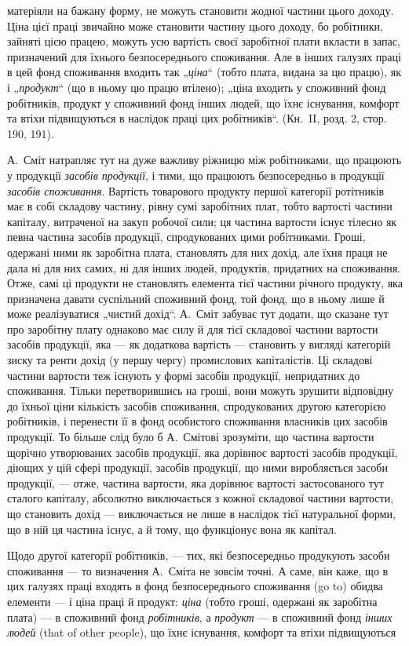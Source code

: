 \parcont{}  %
матеріяли на бажану форму, не можуть становити жодної частини цього
доходу. Ціна цієї праці звичайно може становити частину цього доходу,
бо робітники, зайняті цією працею, можуть усю вартість своєї заробітної
плати вкласти в запас, призначений для їхнього безпосереднього споживання.
Але в інших галузях праці в цей фонд споживання входить так
„\emph{ціна}“ (тобто плата, видана за цю працю), як і „\emph{продукт}“ (що в
ньому цю працю втілено); „ціна входить у споживний фонд робітників,
продукт у споживний фонд інших людей, що їхнє існування, комфорт
та втіхи підвищуються в наслідок праці цих робітників“. (Кн.~II, розд. 2,
стор. 190, 191).

А.~Сміт натрапляє тут на дуже важливу ріжницю між робітниками,
що працюють у продукції \emph{засобів продукції}, і тими, що працюють
безпосередньо в продукції \emph{засобів споживання}. Вартість
товарового продукту першої категорії ротітників має в собі складову
частину, рівну сумі заробітних плат, тобто вартості частини капіталу,
витраченої на закуп робочої сили; ця частина вартости існує тілесно як
певна частина засобів продукції, спродукованих цими робітниками. Гроші,
одержані ними як заробітна плата, становлять для них дохід, але їхня
праця не дала ні для них самих, ні для інших людей, продуктів, придатних
на споживання. Отже, самі ці продукти не становлять елемента
тієї частини річного продукту, яка призначена давати суспільний споживний
фонд, той фонд, що в ньому лише й може реалізуватися „чистий
дохід“. А.~Сміт забуває тут додати, що сказане тут про заробітну
плату однаково має силу й для тієї складової частини вартости засобів
продукції, яка — як додаткова вартість — становить у вигляді категорій
зиску та ренти дохід (у першу чергу) промислових капіталістів. Ці складові
частини вартости теж існують у формі засобів продукції, непридатних
до споживання. Тільки перетворившись на гроші, вони можуть
зрушити відповідну до їхньої ціни кількість засобів споживання, спродукованих
другою категорією робітників, і перенести її в фонд особистого
споживання власників цих засобів продукції. То більше слід було б
А.~Смітові зрозуміти, що частина вартости щорічно утворюваних засобів
продукції, яка дорівнює вартості засобів продукції, діющих у цій сфері
продукції, засобів продукції, що ними виробляється засоби продукції, —
отже, частина вартости, яка дорівнює вартості застосованого тут сталого
капіталу, абсолютно виключається з кожної складової частини вартости,
що становить дохід — виключається не лише в наслідок тієї натуральної
форми, що в ній ця частина існує, а й тому, що функціонує вона як
капітал.

Щодо другої категорії робітників, — тих, які безпосередньо продукують
засоби споживання — то визначення А.~Сміта не зовсім точні.
А саме, він каже, що в цих галузях праці входять в фонд безпосереднього
споживання (go to) обидва елементи — і ціна праці й продукт:
\emph{ціна} (тобто гроші, одержані як заробітна плата) — в споживний фонд
\emph{робітників}, а \emph{продукт} — в споживний фонд \emph{інших людей}
(that of other people), що їхнє існування, комфорт та втіхи підвищуються
\parbreak{}  %
